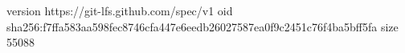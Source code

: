 version https://git-lfs.github.com/spec/v1
oid sha256:f7ffa583aa598fec8746cfa447e6eedb26027587ea0f9c2451c76f4ba5bff5fa
size 55088
